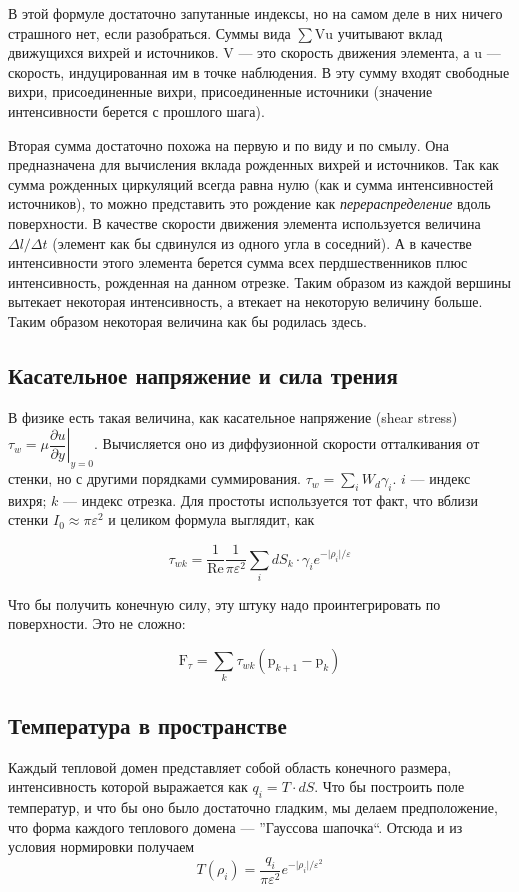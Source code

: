 \documentclass[14pt]{extreport}
\newcommand{\br}[1]{\boldsymbol{\mathrm{#1}}}
\renewcommand{\vec}[1]{\br{#1}}
\newcommand{\Reyn}{\text{Re}}
\begin{document}
В этой формуле достаточно запутанные индексы, но на самом деле в них ничего страшного нет, если разобраться.
Суммы вида $\sum \vec V \vec u$ учитывают вклад движущихся вихрей и источников. $\vec V$ --- это скорость движения элемента, а $\vec u$ --- скорость, индуцированная им в точке наблюдения.
В эту сумму входят свободные вихри, присоединенные вихри, присоединенные источники (значение интенсивности берется с прошлого шага).

Вторая сумма достаточно похожа на первую и по виду и по смылу. Она предназначена для вычисления вклада рожденных вихрей и источников. Так как сумма рожденных циркуляций всегда равна нулю (как и сумма интенсивностей источников), то можно представить это рождение как \textit{перераспределение} вдоль поверхности. В качестве скорости движения элемента используется величина ${\Delta l}/{\Delta t}$ (элемент как бы сдвинулся из одного угла в соседний). А в качестве интенсивности этого элемента берется сумма всех пердшественников плюс интенсивность, рожденная на данном отрезке.
Таким образом из каждой вершины вытекает некоторая интенсивность, а втекает на некоторую величину больше. Таким образом некоторая величина как бы родилась здесь.

\subsection{Касательное напряжение и сила трения}

В физике есть такая величина, как касательное напряжение (shear stress) $\tau_w = \mu \left. \dfrac{\partial u}{\partial y} \right|_{y=0}$. Вычисляется оно из диффузионной скорости отталкивания от стенки, но с другими порядками суммирования. $ \tau_w = \sum_i {W_d \gamma_i}$. $i$ --- индекс вихря; $k$ --- индекс отрезка. Для простоты используется тот факт, что вблизи стенки $I_0 \approx \pi\varepsilon^2$ и целиком формула выглядит, как

$$ \tau_{wk} = \dfrac{1}{\Reyn}\dfrac{1}{\pi\varepsilon^2} \sum\limits_i dS_k\cdot \gamma_i e^{-\lvert\rho_i\rvert/\varepsilon}$$

Что бы получить конечную силу, эту штуку надо проинтегрировать по поверхности. Это не сложно:

$$ \br F_\tau = \sum_k {\tau_{wk} (\br p_{k+1} - \br p_k) } $$

\subsection{Температура в пространстве}
Каждый тепловой домен представляет собой область конечного размера, интенсивность которой выражается как $q_i = T \cdot dS$. Что бы построить поле температур, и что бы оно было достаточно гладким, мы делаем предположение, что форма каждого теплового домена --- ''Гауссова шапочка``. Отсюда и из условия нормировки получаем
$$T(\rho_i) = \dfrac{q_i}{\pi \varepsilon^2} e^{-\lvert \rho_i \rvert / \varepsilon^2}$$
\end{document}
